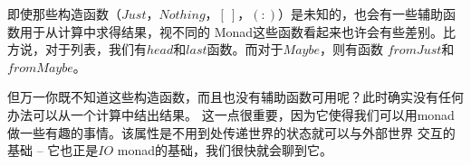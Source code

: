 即使那些构造函数（$Just$，$Nothing$，$[\ ]$，$(:)$）是未知的，也会有一些辅助函数用于从计算中求得结果，视不同的
Monad这些函数看起来也许会有些差别。比方说，对于列表，我们有$head$和$last$函数。而对于$Maybe$，则有函数
$fromJust$和$fromMaybe$。

但万一你既不知道这些构造函数，而且也没有辅助函数可用呢？此时确实没有任何办法可以从一个计算中结出结果。
这一点很重要，因为它使得我们可以用monad做一些有趣的事情。该属性是不用到处传递世界的状态就可以与外部世界
交互的基础 -- 它也正是$IO$ monad的基础，我们很快就会聊到它。
